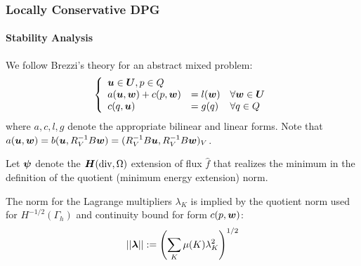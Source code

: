 \documentclass[18pt,xcolor=table]{beamer}
\begin{document}
\begin{frame}
\frametitle{Locally Conservative DPG}
\framesubtitle{Stability Analysis}
We follow Brezzi's theory for an abstract mixed problem:
\begin{equation*}
\left\{
\begin{array}{lll}
\boldsymbol u \in \boldsymbol U, p \in Q\\
a(\boldsymbol u,\boldsymbol w) + c(p,\boldsymbol w) & = l(\boldsymbol w) & \forall \boldsymbol w \in \boldsymbol U \\
c(q,\boldsymbol u) & = g(q) & \forall q \in Q
\end{array}
\right.
\end{equation*}
where $a,c,l,g$ denote the appropriate
bilinear and linear forms. Note that
$a(\boldsymbol u,\boldsymbol w)=b(\boldsymbol u,R_V^{-1}B\boldsymbol w)=(R_V^{-1}B\boldsymbol u,R_V^{-1}B\boldsymbol w)_V$.

Let $\boldsymbol\psi$ denote the $\mbox{\boldmath $H$}(\text{div},\Omega)$ extension of flux $\hat{f}$
that realizes the minimum in the definition of the quotient (minimum energy
extension) norm.

The norm for the Lagrange multipliers $\lambda_K$ is implied
by the quotient norm used for $H^{-1/2}(\Gamma_h)$ and continuity
bound for form $c(p,\boldsymbol w)$:
\[
||\boldsymbol\lambda||:=\left(\sum_K \mu(K) \lambda_K^2\right)^{1/2}
\]
\end{frame}

\end{document}
